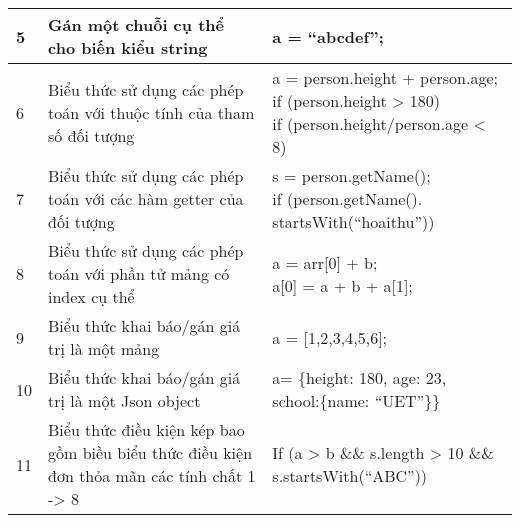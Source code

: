 \begin{longtable}{ |p{1cm}|p{7cm}|p{}|}
        \\
        \hline
        5 & Gán một chuỗi cụ thể cho biến kiểu string & a = “abcdef”;\\
        \hline
        6 & Biểu thức sử dụng các phép toán với thuộc tính của tham số đối tượng   & \makecell[l]{a = person.height + person.age;\\
        if (person.height > 180)\\
        if (person.height/person.age <  8)} 
        \\ 
        \hline
        7 & Biểu thức sử dụng các phép toán với các hàm getter của đối tượng & \makecell[l]{s = person.getName();\\
        if (person.getName().\\startsWith(“hoaithu”))} 
        \\
         \hline
        8 & Biểu thức sử dụng các phép toán với phần tử mảng có index cụ thể &\makecell[l]{ a = arr[0] + b; \\
        a[0] = a + b + a[1];} 
        \\
         \hline
        9 & Biểu thức khai báo/gán giá trị là một mảng & a = [1,2,3,4,5,6];\\
         \hline
        10 &Biểu thức khai báo/gán giá trị là một Json object & \makecell[l]{a= \{height: 180, age: 23, \\school:\{name: “UET”\}\}}\\
         \hline
        11 & Biểu thức điều kiện kép bao gồm biều biểu thức điều kiện đơn thỏa mãn các tính chất 1 -> 8 & If (a > b \&\& s.length > 10 \&\& s.startsWith(“ABC”))
    \label{table:expressions}
\end{longtable}

